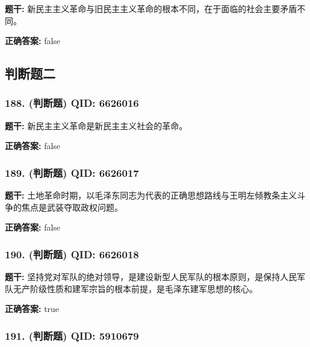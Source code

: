 \documentclass[12pt,UTF8]{ctexart}
\begin{document}
\textbf{题干:}
新民主主义革命与旧民主主义革命的根本不同，在于面临的社会主要矛盾不同。

\textbf{正确答案:}
false

\vspace{0.3em}\hrulefill\vspace{0.7em}

\subsection*{判断题二}

\subsubsection*{188. (判断题) \small QID: 6626016}

\textbf{题干:}
新民主主义革命是新民主主义社会的革命。

\textbf{正确答案:}
false

\vspace{0.3em}\hrulefill\vspace{0.7em}

\subsubsection*{189. (判断题) \small QID: 6626017}

\textbf{题干:}
土地革命时期，以毛泽东同志为代表的正确思想路线与王明左倾教条主义斗争的焦点是武装夺取政权问题。

\textbf{正确答案:}
false

\vspace{0.3em}\hrulefill\vspace{0.7em}

\subsubsection*{190. (判断题) \small QID: 6626018}

\textbf{题干:}
坚持党对军队的绝对领导，是建设新型人民军队的根本原则，是保持人民军队无产阶级性质和建军宗旨的根本前提，是毛泽东建军思想的核心。

\textbf{正确答案:}
true

\vspace{0.3em}\hrulefill\vspace{0.7em}

\subsubsection*{191. (判断题) \small QID: 5910679}
\end{document}
